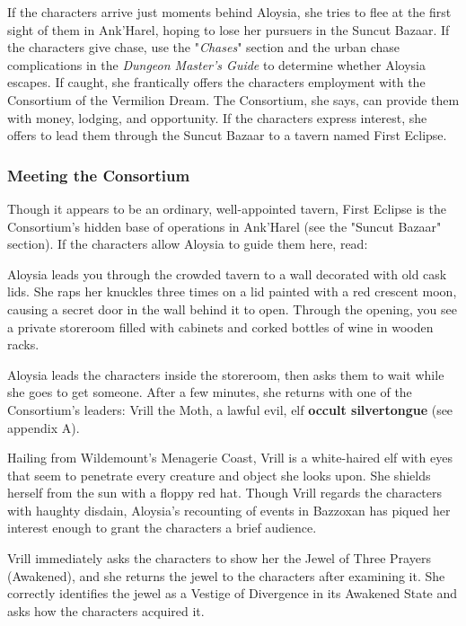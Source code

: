\documentclass[10pt,a4paper,twoside,fancy,bg=print,twocolumn,openany,nodeprecatedcode]{dndbook}
\begin{document}
If the characters arrive just moments behind Aloysia, she tries to flee at the first sight of them in Ank'Harel, hoping to lose her pursuers in the Suncut Bazaar. If the characters give chase, use the "\textit{Chases}" section and the urban chase complications in the \textit{Dungeon Master's Guide} to determine whether Aloysia escapes. If caught, she frantically offers the characters employment with the Consortium of the Vermilion Dream. The Consortium, she says, can provide them with money, lodging, and opportunity. If the characters express interest, she offers to lead them through the Suncut Bazaar to a tavern named First Eclipse.

\subsubsection{Meeting the Consortium}
Though it appears to be an ordinary, well-appointed tavern, First Eclipse is the Consortium's hidden base of operations in Ank'Harel (see the "Suncut Bazaar" section). If the characters allow Aloysia to guide them here, read:

\begin{DndReadAloud}{}
Aloysia leads you through the crowded tavern to a wall decorated with old cask lids. She raps her knuckles three times on a lid painted with a red crescent moon, causing a secret door in the wall behind it to open. Through the opening, you see a private storeroom filled with cabinets and corked bottles of wine in wooden racks.

\end{DndReadAloud}

Aloysia leads the characters inside the storeroom, then asks them to wait while she goes to get someone. After a few minutes, she returns with one of the Consortium's leaders: Vrill the Moth, a lawful evil, elf \textbf{occult silvertongue} (see appendix A).

Hailing from Wildemount's Menagerie Coast, Vrill is a white-haired elf with eyes that seem to penetrate every creature and object she looks upon. She shields herself from the sun with a floppy red hat. Though Vrill regards the characters with haughty disdain, Aloysia's recounting of events in Bazzoxan has piqued her interest enough to grant the characters a brief audience.

Vrill immediately asks the characters to show her the Jewel of Three Prayers (Awakened), and she returns the jewel to the characters after examining it. She correctly identifies the jewel as a Vestige of Divergence in its Awakened State and asks how the characters acquired it.
\end{document}
